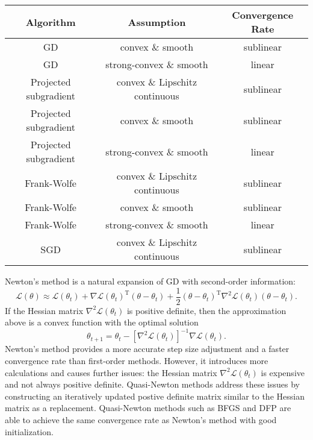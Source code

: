 \documentclass[a4paper,11pt]{article}
\begin{document}
\begin{center}
\begin{tabular}{||c c c||} 
\hline
Algorithm & Assumption & Convergence Rate \\ [0.5ex] 
\hline\hline
GD & convex \& smooth & sublinear \\ 
\hline
GD & strong-convex \& smooth & linear \\
\hline
Projected subgradient & convex \& Lipschitz continuous & sublinear \\
\hline
Projected subgradient & convex \& smooth & sublinear \\
\hline
Projected subgradient & strong-convex \& smooth & linear \\
\hline
Frank-Wolfe & convex \& Lipschitz continuous & sublinear \\
\hline
Frank-Wolfe & convex \& smooth & sublinear \\
\hline
Frank-Wolfe & strong-convex \& smooth & linear \\
\hline
SGD & convex \& Lipschitz continuous & sublinear \\
\hline
\end{tabular}
\end{center}

Newton's method is a natural expansion of GD with second-order information: $$\mathcal{L}(\theta) \approx \mathcal{L}(\theta_t) + \nabla \mathcal{L}(\theta_t)^\mathrm{T}(\theta - \theta_t) + \frac{1}{2}(\theta-\theta_t)^\mathrm{T}\nabla^2\mathcal{L}(\theta_t)(\theta-\theta_t).$$ If the Hessian matrix $\nabla^2\mathcal{L}(\theta_t)$ is positive definite, then the approximation above is a convex function with the optimal solution $$\theta_{t+1} = \theta_t - [\nabla^2\mathcal{L}(\theta_t)]^{-1}\nabla\mathcal{L}(\theta_t).$$ Newton's method provides a more accurate step size adjustment and a faster convergence rate than first-order methods. However, it introduces more calculations and causes further issues: the Hessian matrix $\nabla^2\mathcal{L}(\theta_t)$ is expensive and not always positive definite. Quasi-Newton methods address these issues by constructing an iteratively updated postive definite matrix similar to the Hessian matrix as a replacement. Quasi-Newton methods such as BFGS and DFP are able to achieve the same convergence rate as Newton's method with good initialization.
\end{document}
